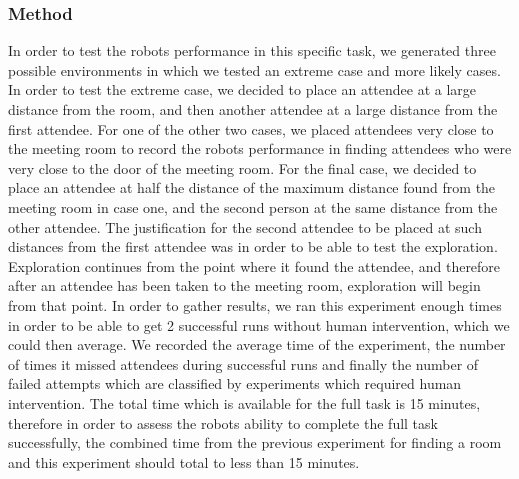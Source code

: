 \documentclass[conference]{IEEEtran}
\begin{document}
\subsubsection{Method}
In order to test the robots performance in this specific task, we generated three possible environments in which we tested an extreme case and more likely cases. In order to test the extreme case, we decided to place an attendee at a large distance from the room, and then another attendee at a large distance from the first attendee. For one of the other two cases, we placed attendees very close to the meeting room to record the robots performance in finding attendees who were very close to the door of the meeting room. For the final case, we decided to place an attendee at half the distance of the maximum distance found from the meeting room in case one, and the second person at the same distance from the other attendee. The justification for the second attendee to be placed at such distances from the first attendee was in order to be able to test the exploration. Exploration continues from the point where it found the attendee, and therefore after an attendee has been taken to the meeting room, exploration will begin from that point. In order to gather results, we ran this experiment enough times in order to be able to get 2 successful runs without human intervention, which we could then average. We recorded the average time of the experiment, the number of times it missed attendees during successful runs and finally the number of failed attempts which are classified by experiments which required human intervention. The total time which is available for the full task is 15 minutes, therefore in order to assess the robots ability to complete the full task successfully, the combined time from the previous experiment for finding a room and this experiment should total to less than 15 minutes.
\end{document}
